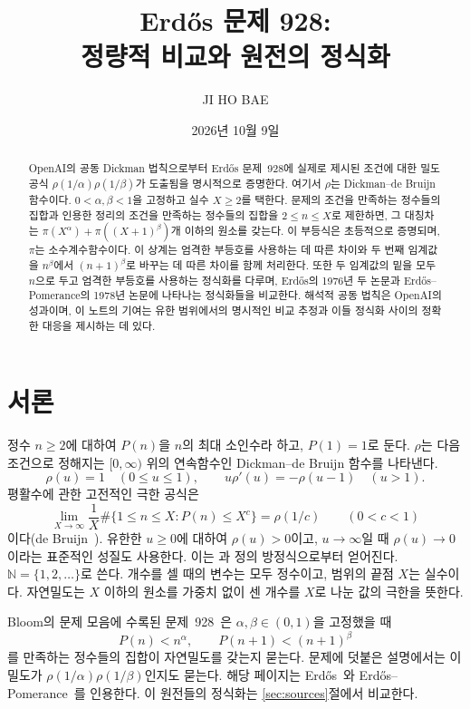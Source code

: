 \documentclass[11pt,a4paper]{amsart}
\title[Erd\H{o}s 문제 928과 공동 Dickman 법칙]{Erd\H{o}s 문제 928:\\
정량적 비교와 원전의 정식화}
\author{JI HO BAE}
\date{2026년 10월 9일}
\theoremstyle{korplain}
\newcommand{\N}{\mathbb N}
\begin{document}
\begin{abstract}
OpenAI의 공동 Dickman 법칙으로부터 Erd\H{o}s 문제~928에 실제로 제시된 조건에 대한
밀도 공식 $\rho(1/\alpha)\rho(1/\beta)$가 도출됨을 명시적으로 증명한다.
여기서 $\rho$는 Dickman--de Bruijn 함수이다.
$0<\alpha,\beta<1$을 고정하고 실수 $X\ge2$를 택한다.
문제의 조건을 만족하는 정수들의 집합과 인용한 정리의 조건을 만족하는
정수들의 집합을 $2\le n\le X$로 제한하면, 그 대칭차는
$\pi(X^\alpha)+\pi((X+1)^\beta)$개 이하의 원소를 갖는다.
이 부등식은 초등적으로 증명되며, $\pi$는 소수계수함수이다.
이 상계는 엄격한 부등호를 사용하는 데 따른 차이와 두 번째 임계값을
$n^\beta$에서 $(n+1)^\beta$로 바꾸는 데 따른 차이를 함께 처리한다.
또한 두 임계값의 밑을 모두 $n$으로 두고 엄격한 부등호를 사용하는 정식화를 다루며,
Erd\H{o}s의 1976년 두 논문과 Erd\H{o}s--Pomerance의 1978년 논문에 나타나는
정식화들을 비교한다. 해석적 공동 법칙은 OpenAI의 성과이며,
이 노트의 기여는 유한 범위에서의 명시적인 비교 추정과 이들 정식화 사이의
정확한 대응을 제시하는 데 있다.
\end{abstract}
\maketitle

\section{서론}

정수 $n\ge2$에 대하여 $P(n)$을 $n$의 최대 소인수라 하고, $P(1)=1$로 둔다.
$\rho$는 다음 조건으로 정해지는 $[0,\infty)$ 위의 연속함수인
Dickman--de Bruijn 함수를 나타낸다.
\[
 \rho(u)=1\quad(0\le u\le1),\qquad
 u\rho'(u)=-\rho(u-1)\quad(u>1).
\]
평활수에 관한 고전적인 극한 공식은
\begin{equation}\label{eq:marginal}
 \lim_{X\to\infty}\frac1X
 \#\{1\le n\le X:P(n)\le X^c\}=\rho(1/c)
 \qquad(0<c<1)
\end{equation}
이다(de Bruijn~\cite[51쪽, (1.1)--(1.2)]{deBruijn1951}).
유한한 $u\ge0$에 대하여 $\rho(u)>0$이고,
$u\to\infty$일 때 $\rho(u)\to0$이라는 표준적인 성질도 사용한다.
이는 \cite[52쪽, (1.8)]{deBruijn1951}과 정의 방정식으로부터 얻어진다.
$\N=\{1,2,\ldots\}$로 쓴다. 개수를 셀 때의 변수는 모두 정수이고,
범위의 끝점 $X$는 실수이다. 자연밀도는 $X$ 이하의 원소를 가중치 없이 센 개수를
$X$로 나눈 값의 극한을 뜻한다.

Bloom의 문제 모음에 수록된 문제~928~\cite{Bloom928}은
$\alpha,\beta\in(0,1)$을 고정했을 때
\begin{equation}\label{eq:problem}
 P(n)<n^\alpha,\qquad P(n+1)<(n+1)^\beta
\end{equation}
를 만족하는 정수들의 집합이 자연밀도를 갖는지 묻는다.
문제에 덧붙은 설명에서는 이 밀도가 $\rho(1/\alpha)\rho(1/\beta)$인지도 묻는다.
해당 페이지는 Erd\H{o}s~\cite{Erdos1976Manitoba,Erdos1976Debrecen}와
Erd\H{o}s--Pomerance~\cite{ErdosPomerance1978}를 인용한다.
이 원전들의 정식화는 \ref{sec:sources}절에서 비교한다.
\end{document}
